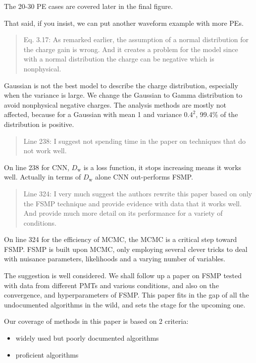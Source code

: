 \documentclass[12pt]{article}
\begin{document}
The 20-30 PE cases are covered later in the final figure.

That said, if you insist, we can put another waveform example with more PEs.

\begin{quote}
Eq. 3.17: As remarked earlier, the assumption of a normal distribution for the charge gain is wrong. And it creates a problem for the model since with a normal distribution the charge can be negative which is nonphysical.
\end{quote}

Gaussian is not the best model to describe the charge distribution, especially when the variance is large. We change the Gaussian to Gamma distribution to avoid nonphysical negative charges. The analysis methods are mostly not affected, because for a Gaussian with mean 1 and variance $0.4^2$, 99.4\% of the distribution is positive.

\begin{quote}
Line 238: I suggest not spending time in the paper on techniques that do not work well.
\end{quote}

On line 238 for CNN, $D_\mathrm{w}$ is a loss function, it stops increasing means it works well.  Actually in terms of $D_\mathrm{w}$ alone CNN out-performs FSMP.

\begin{quote}
Line 324: I very much suggest the authors rewrite this paper based on only the FSMP technique and provide evidence with data that it works well. And provide much more detail on its performance for a variety of conditions.
\end{quote}

On line 324 for the efficiency of MCMC, the MCMC is a critical step toward FSMP.  FSMP is built upon MCMC, only employing several clever tricks to deal with nuisance parameters, likelihoods and a varying number of variables.

The suggestion is well considered.  We shall follow up a paper on FSMP tested with data from different PMTs and various conditions, and also on the convergence, and hyperparameters of FSMP.  This paper fits in the gap of all the undocumented algorithms in the wild, and sets the stage for the upcoming one.

Our coverage of methods in this paper is based on 2 criteria:

\begin{itemize}
    \item widely used but poorly documented algorithms
    \item proficient algorithms
\end{itemize}
\end{document}
